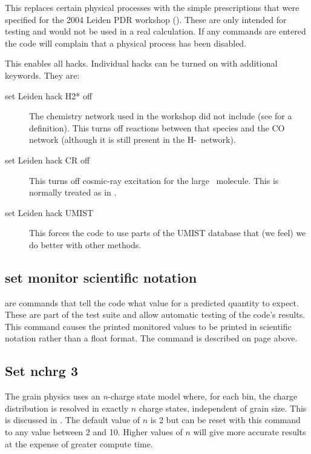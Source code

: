 This replaces certain physical processes with the simple prescriptions
that were specified for the 2004 Leiden PDR workshop
(\citealp{Roellig2007}).
These are only intended for testing and would not be used
in a real calculation.
If any  commands are entered the code will
complain that a physical process has been disabled.

This enables all hacks.
Individual hacks can be turned on with additional keywords.
They are:

\begin{description}
\item[set Leiden hack H2* off]  The chemistry network used in the workshop did
not include \htwo* (see \citealp{Tielens1985a} for a definition).  This
turns off reactions between that species and the CO network (although it
is still present in the H-\htwo\ network).

\item[set Leiden hack CR off]  This turns off cosmic-ray excitation for the
large \htwo\ molecule.
This is normally treated as in \citet{Dalgarno1999}.

\item[set Leiden hack UMIST]  This forces the code to use parts of the UMIST
database that (we feel) we do better with other methods.
\end{description}

\subsection{set monitor scientific notation}
 are commands that
tell the code what value for a predicted quantity to expect.  These are
part of the test suite and allow automatic testing of the code's results.
This command causes the printed monitored values to be printed in scientific
notation rather than a float format.
The  command is described on page
\pageref{sec:CommandMonitor} above.

\subsection{Set nchrg 3}
\label{sec:SetNchrg}

The grain physics uses an \emph{n}-charge state model where, for each bin,
the charge distribution is resolved in exactly $n$ charge states,
independent of grain size.
This is discussed in \citet{VanHoof2004}.
The default
value of $n$ is 2 but can be reset with this command
to any value between 2 and 10.
Higher values of $n$ will give more accurate results at the expense
of greater compute time.

